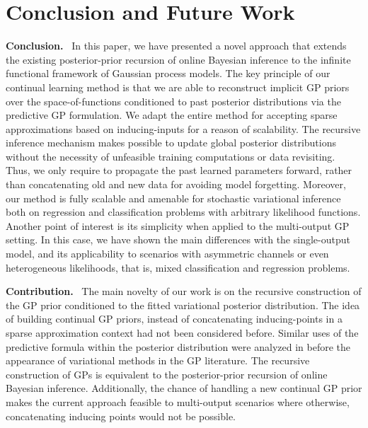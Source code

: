 \documentclass[]{article}
\begin{document}
\section{Conclusion and Future Work}

\textbf{Conclusion.}~ In this paper, we have presented a novel approach that extends the existing posterior-prior recursion of online Bayesian inference to the infinite functional framework of Gaussian process models. The key principle of our continual learning method is that we are able to reconstruct implicit GP priors over the space-of-functions conditioned to past posterior distributions via the predictive GP formulation. We adapt the entire method for accepting sparse approximations based on inducing-inputs for a reason of scalability. The recursive inference mechanism makes possible to update global posterior distributions without the necessity of unfeasible training computations or data revisiting. Thus, we only require to propagate the past learned parameters forward, rather than concatenating old and new data for avoiding model forgetting. Moreover, our method is fully scalable and amenable for stochastic variational inference both on regression and classification problems with arbitrary likelihood functions. Another point of interest is its simplicity when applied to the multi-output GP setting. In this case, we have shown the main differences with the single-output model, and its applicability to scenarios with asymmetric channels or even heterogeneous likelihoods, that is, mixed classification and regression problems.

\textbf{Contribution.}~ The main novelty of our work is on the recursive construction of the GP prior conditioned to the fitted variational posterior distribution. The idea of building continual GP priors, instead of concatenating inducing-points in a sparse approximation context had not been considered before. Similar uses of the predictive formula within the posterior distribution were analyzed in \citet{girard2003gaussian} before the appearance of variational methods in the GP literature. The recursive construction of GPs is equivalent to the posterior-prior recursion of online Bayesian inference. Additionally, the chance of handling a new continual GP prior makes the current approach feasible to multi-output scenarios where otherwise, concatenating inducing points would not be possible. 
 
\end{document}
